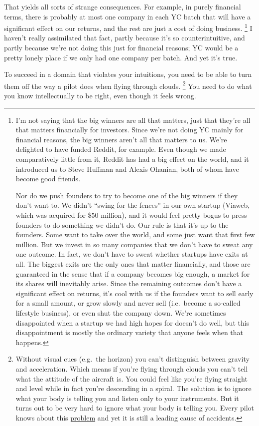 That yields all sorts of strange consequences. For example, in purely
financial terms, there is probably at most one company in each YC batch
that will have a significant effect on our returns, and the rest are
just a cost of doing business. \footnote{I'm not saying that the big winners are all that matters, just
that they're all that matters financially for investors. Since we're not
doing YC mainly for financial reasons, the big winners aren't all that
matters to us. We're delighted to have funded Reddit, for example. Even
though we made comparatively little from it, Reddit has had a big effect
on the world, and it introduced us to Steve Huffman and Alexis Ohanian,
both of whom have become good friends.

Nor do we push founders to try to become one of the big winners if they
don't want to. We didn't ``swing for the fences'' in our own startup
(Viaweb, which was acquired for \$50 million), and it would feel pretty
bogus to press founders to do something we didn't do. Our rule is that
it's up to the founders. Some want to take over the world, and some just
want that first few million. But we invest in so many companies that we
don't have to sweat any one outcome. In fact, we don't have to sweat
whether startups have exits at all. The biggest exits are the only ones
that matter financially, and those are guaranteed in the sense that if a
company becomes big enough, a market for its shares will inevitably
arise. Since the remaining outcomes don't have a significant effect on
returns, it's cool with us if the founders want to sell early for a
small amount, or grow slowly and never sell (i.e.~become a so-called
lifestyle business), or even shut the company down. We're sometimes
disappointed when a startup we had high hopes for doesn't do well, but
this disappointment is mostly the ordinary variety that anyone feels
when that happens.} I haven't really
assimilated that fact, partly because it's so counterintuitive, and
partly because we're not doing this just for financial reasons; YC would
be a pretty lonely place if we only had one company per batch. And yet
it's true.

To succeed in a domain that violates your intuitions, you need to be
able to turn them off the way a pilot does when flying through clouds.
\footnote{Without visual cues (e.g.~the horizon) you can't distinguish
between gravity and acceleration. Which means if you're flying through
clouds you can't tell what the attitude of the aircraft is. You could
feel like you're flying straight and level while in fact you're
descending in a spiral. The solution is to ignore what your body is
telling you and listen only to your instruments. But it turns out to be
very hard to ignore what your body is telling you. Every pilot knows
about this
\href{http://en.wikipedia.org/wiki/Spatial_disorientation}{problem} and
yet it is still a leading cause of accidents.} You need to do what you know intellectually to
be right, even though it feels wrong.

